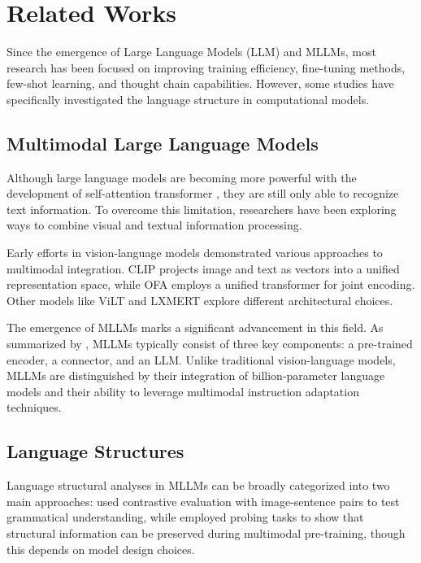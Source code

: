 \section{Related Works}
Since the emergence of Large Language Models (LLM) and MLLMs, most research has been focused on improving training efficiency, fine-tuning methods, few-shot learning, and thought chain capabilities. However, some studies have specifically investigated the language structure in computational models. 

\subsection{Multimodal Large Language Models}
Although large language models are becoming more powerful with the development of self-attention transformer \citep{zhao2023survey}, they are still only able to recognize text information. To overcome this limitation, researchers have been exploring ways to combine visual and textual information processing.

Early efforts in vision-language models demonstrated various approaches to multimodal integration. CLIP \citep{Radford2021LearningTV} projects image and text as vectors into a unified representation space, while OFA \citep{pmlr-v162-wang22al} employs a unified transformer for joint encoding. Other models like ViLT \citep{kim2021viltvisionandlanguagetransformerconvolution} and LXMERT \citep{DBLP:journals/corr/abs-1908-07490} explore different architectural choices.

The emergence of MLLMs marks a significant advancement in this field. As summarized by \citet{yin2023survey}, MLLMs typically consist of three key components: a pre-trained encoder, a connector, and an LLM. Unlike traditional vision-language models, MLLMs are distinguished by their integration of billion-parameter language models and their ability to leverage multimodal instruction adaptation techniques. 

\subsection{Language Structures}
Language structural analyses in MLLMs can be broadly categorized into two main approaches: \citet{nikolaus2022vision} used contrastive evaluation with image-sentence pairs to test grammatical understanding, while \citet{DBLP:journals/corr/abs-2102-11115} employed probing tasks to show that structural information can be preserved during multimodal pre-training, though this depends on model design choices.

